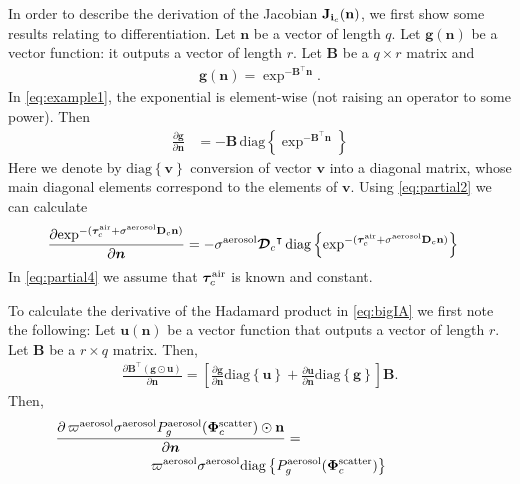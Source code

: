 \documentclass[10pt,letterpaper]{article}
\newcommand{\OpDistance}{\bm{\mathcal{D}}}
\newcommand{\OpDiag}[1]{\mathrm{diag}\left\{#1\right\}}
\newcommand{\PartDeriv}[2]{\frac{\partial{#1}}{\partial{#2}}}
\newcommand{\vect}[1]{\bm{#1}}
\newcommand{\mat}[1]{\bm{#1}}
\newcommand{\transpose}[1]{{#1}^\intercal}
\begin{document}
In order to describe the derivation of the Jacobian ${\bf J}_{{\bf
    i}_c}({\bf n})$, we first show some results relating to
differentiation. Let $\vect{n}$ be a vector of length $q$. Let
$\vect{g}(\vect{n})$ be a vector function: it outputs a vector of
length $r$. Let $\mat{B}$ be a $q \times r$ matrix and
\begin{align}
  \vect{g}(\vect{n}) = \exp^{-\transpose{\mat{B}}\vect{n}}.
  \label{eq:example1}
\end{align}
In \cref{eq:example1}, the exponential is element-wise (not raising an
operator to some power). Then
\begin{align}
  \label{eq:partial2}
  \PartDeriv{\vect{g}}{\vect{n}} &= - \mat{B} \,
  \OpDiag{\exp^{-\transpose{\mat{B}}\vect{n}}}
\end{align}
Here we denote by $\OpDiag{\vect{v}}$ conversion of vector $\vect{v}$
into a diagonal matrix, whose main diagonal elements correspond to the
elements of $\vect{v}$. Using \cref{eq:partial2} we can calculate
\begin{align}
  \label{eq:partial4}
  \PartDeriv{\exp^{-(\vect{\tau}_c^{\rm air} + {\sigma}^{\rm aerosol}
      {\bf D}_c {\bf n})}}
  {\vect{n}} &= - {\sigma}^{\rm aerosol}\transpose{\OpDistance_c} \,
  \OpDiag{\exp^{-(\vect{\tau}_c^{\rm air} + {\sigma}^{\rm aerosol}
      {\bf D}_c {\bf n})}}
\end{align}
In \cref{eq:partial4} we assume that $\vect{\tau}_c^{\rm air}$ is
known and constant.

To calculate the derivative of the Hadamard product in \cref{eq:bigIA}
we first note the following: Let $\vect{u}(\vect{n})$ be a vector
function that outputs a vector of length $r$. Let $\mat{B}$ be a $r
\times q$ matrix. Then,
\begin{align}
  \label{eq:partial1}
  \PartDeriv{\transpose{\mat{B}} (\vect{g} \odot \vect{u})}{\vect{n}}
  = \left[ \PartDeriv{\vect{g}}{\vect{n}} \OpDiag{\vect{u}} +
    \PartDeriv{\vect{u}}{\vect{n}} \OpDiag{\vect{g}} \right] \mat{B}.
\end{align}
Then,
\begin{align}
  \label{eq:partial3}
  \PartDeriv{\, \varpi^{\rm aerosol}\sigma^{\rm aerosol} P^{\rm
      aerosol}_g(\vect{\Phi}^{\rm scatter}_c) \odot{\bf n}}{\vect{n}}
  =
  \;\;\;\;\;\;\;\;\;\;\;\;\;\;\;\;\;\;\;\;\;\;\;\;\;\;\;\;\;\;\;\;\;\;\;\;\;\;\;\;\;\;
  \nonumber \\
  \varpi^{\rm aerosol}\sigma^{\rm aerosol}\OpDiag{P^{\rm
      aerosol}_g(\vect{\Phi}^{\rm scatter}_c)}
  \;\;\;\;\;\;\;\;\;\;\;\;\;\;\;\;\;\;\;\;
\end{align}
\end{document}
